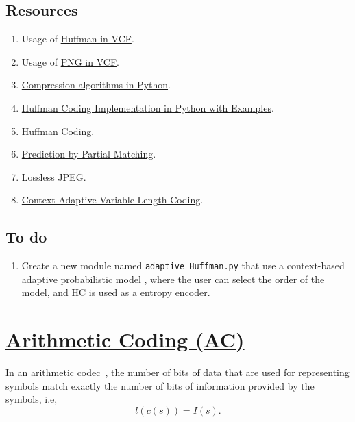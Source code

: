 \subsection*{Resources}
\begin{enumerate}
\item Usage of \href{https://github.com/Sistemas-Multimedia/VCF/blob/main/notebooks/Huffman.ipynb}{Huffman in VCF}.
\item Usage of \href{https://github.com/Sistemas-Multimedia/VCF/blob/main/notebooks/PNG.ipynb}{PNG in VCF}.
\item \href{https://www.inference.org.uk/mackay/python/compress/#Huff}{Compression algorithms in Python}.
\item \href{https://favtutor.com/blogs/huffman-coding}{Huffman Coding Implementation in Python with Examples}.
\item \href{https://www.programiz.com/dsa/huffman-coding}{Huffman Coding}.
\item \href{https://en.wikipedia.org/wiki/Prediction_by_partial_matching}{Prediction by Partial Matching}.
\item \href{https://en.wikipedia.org/wiki/Lossless_JPEG}{Lossless JPEG}.
\item \href{https://en.wikipedia.org/wiki/Context-adaptive_variable-length_coding}{Context-Adaptive Variable-Length Coding}.
\end{enumerate}

\subsection*{To do}
\begin{enumerate}
\item Create a new module named \texttt{adaptive\_Huffman.py} that use
  a context-based adaptive probabilistic model
  \cite{nelson96datacompression}, where the user can select the order
  of the model, and HC is used as a entropy encoder.
\end{enumerate}

\section{\href{https://en.wikipedia.org/wiki/Arithmetic_coding}{Arithmetic
    Coding (AC)}}

In an arithmetic codec~\cite{vruiz__arithmetic_coding,ruiz2000compresion}, the number of
bits of data that are used for representing symbols match
exactly the number of bits of information provided by the symbols, i.e,
\begin{equation}
  l(c(s)) = I(s).
\end{equation}

